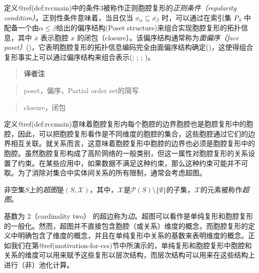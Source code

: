 \documentclass[
  12pt,
]{krantz}
\begin{document}
定义@ref(def:rccmain)中的条件3被称作正则胞腔复形的\emph{正则条件（regularity
condition）}。正则性条件意味着，当且仅当
\(x_{\alpha} \subseteq \overline{x_{\beta}}\) 时，可以通过在索引集
\(P_{S}\) 中配备一个由\(\alpha\leq\beta\)给出的偏序结构(Poset
structure)来组合实现胞腔复形的拓扑信息，其中 \(\overline{x}\) 表示胞腔
\(x\) 的闭包（closure）。该偏序结构通常称为\emph{面偏序（face
poset）}()，它表明胞腔复形的拓扑信息编码完全由面偏序结构确定()，这使得组合复形事实上可以通过偏序结构来组合表示(; ;
;
)。

\begin{glossarybox}

\begin{quote}
\textbf{译者注}
\end{quote}

\begin{quote}
poset，偏序，Partial order set的简写
\end{quote}

\begin{quote}
closure，闭包
\end{quote}

\end{glossarybox}

定义@ref(def:rccmain)意味着胞腔复形内每个胞腔的边界胞腔也是胞腔复形中的胞腔，因此，可以把胞腔复形看作是不同维度的胞腔的集合，这些胞腔通过它们的边界相互关联。就关系而言，这意味着胞腔复形中胞腔的边界也必须是胞腔复形中的胞腔。虽然胞腔复形构成了高阶网络的一般类别，但这一属性对胞腔复形的关系设置了约束。在某些应用中，如果数据不满足这种约束，那么这种约束可能并不可取。为了消除对集合中实体间关系的所有限制，通常会考虑超图。

\label{hgmain}
非空集\(S\)上的\emph{超图}是\((S,\mathcal{X})\)，其中，\(\mathcal{X}\)是\(\mathcal{P}(S)\setminus\{\emptyset\}\)的子集，\(\mathcal{X}\)的元素被称作\emph{超图}。

基数为 2（cardinality two）
的超边称为\emph{边}。超图可以看作是单纯复形和胞腔复形的一般化。然而，超图并不直接包含胞腔（或关系）维度的概念，而胞腔复形的定义中明确包含了维度的概念，并且在单纯复形中关系的基数来表明维度的概念。正如我们在第@ref(motivation-for-ccs)节中所演示的，单纯复形和胞腔复形中胞腔和关系的维度可以用来赋予这些复形以层次结构，而层次结构可以用来在这些结构上进行（非）池化计算。
\end{document}
